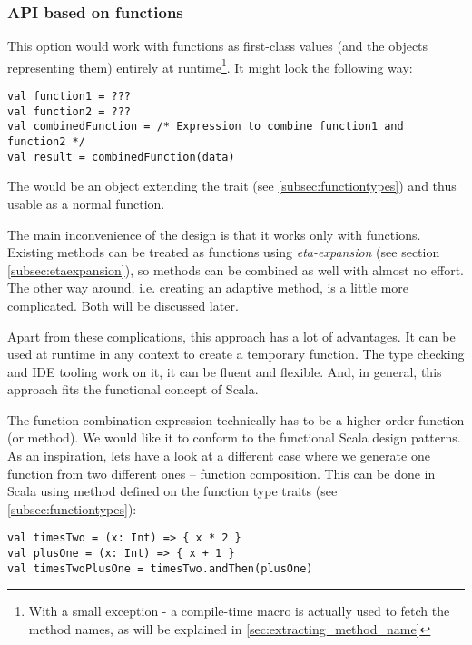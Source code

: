 \subsubsection{API based on functions}

This option would work with functions as first-class values (and the objects representing them) entirely at runtime\footnote{With a small exception - a compile-time macro is actually used to fetch the method names, as will be explained in \ref{sec:extracting_method_name}}. It might look the following way:

\lstset{style=Scala}
\begin{lstlisting}
val function1 = ???
val function2 = ???
val combinedFunction = /* Expression to combine function1 and function2 */
val result = combinedFunction(data)
\end{lstlisting}

The  would be an object extending the  trait (see \ref{subsec:functiontypes}) and thus usable as a normal function.

The main inconvenience of the design is that it works only with functions. Existing methods can be treated as functions using \textit{eta-expansion} (see section \ref{subsec:etaexpansion}), so methods can be combined as well with almost no effort. The other way around, i.e. creating an adaptive method, is a little more complicated. Both will be discussed later.

Apart from these complications, this approach has a lot of advantages. It can be used at runtime in any context to create a temporary function. The type checking and IDE tooling work on it, it can be fluent and flexible. And, in general, this approach fits the functional concept of Scala.

The function combination expression technically has to be a higher-order function (or method). We would like it to conform to the functional Scala design patterns. As an inspiration, lets have a look at a different case where we generate one function from two different ones -- function composition. This can be done in Scala using  method defined on the function type traits (see \ref{subsec:functiontypes}):

\lstset{style=Scala}
\begin{lstlisting}
val timesTwo = (x: Int) => { x * 2 }
val plusOne = (x: Int) => { x + 1 }
val timesTwoPlusOne = timesTwo.andThen(plusOne)
\end{lstlisting}

